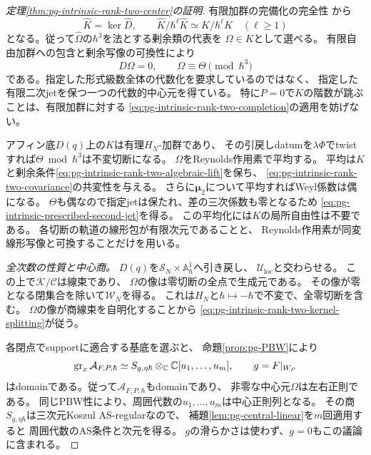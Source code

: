 \begin{proof}[定理\ref{thm:pg-intrinsic-rank-two-center}の証明]
有限加群の完備化の完全性
\cite[Lemmas~10.97.1--10.97.2, Tags~00MA--00MB]{PStacks}から
\begin{equation}
 \widehat K=\ker\widehat D,\qquad
 \widehat K/\hbar^\ell\widehat K\simeq K/\hbar^\ell K\quad(\ell\ge1)
 \label{eq:pg-intrinsic-rank-two-completion}
\end{equation}
となる。従って$\widehat\Omega$の$\hbar^3$を法とする剰余類の代表を
$\Omega\in K$として選べる。
有限自由加群への包含と剰余写像の可換性により
\begin{equation}
 D\Omega=0,\qquad \Omega\equiv\Theta\pmod{\hbar^3}
 \label{eq:pg-intrinsic-rank-two-algebraic-lift}
\end{equation}
である。指定した形式級数全体の代数化を要求しているのではなく、
指定した有限二次jetを保つ一つの代数的中心元を得ている。
特に$P=0$で$K$の階数が跳ぶことは、有限加群に対する
\eqref{eq:pg-intrinsic-rank-two-completion}の適用を妨げない。

アフィン底$D(q)$上の$K$は有理$H_N$-加群であり、
その引戻しdatumを$\lambda\Phi$でtwistすれば$\Theta\bmod\hbar^3$は不変切断になる。
$\Omega$をReynolds作用素で平均する。
平均は$K$と剰余条件\eqref{eq:pg-intrinsic-rank-two-algebraic-lift}を保ち、
\eqref{eq:pg-intrinsic-rank-two-covariance}の共変性を与える。
さらに$\boldsymbol\mu_2$について平均すればWeyl係数は偶になる。
$\Theta$も偶なので指定jetは保たれ、差の三次係数も零となるため
\eqref{eq:pg-intrinsic-prescribed-second-jet}を得る。
この平均化には$K$の局所自由性は不要である。
各切断の軌道の線形包が有限次元であることと、
Reynolds作用素が同変線形写像と可換することだけを用いる。

\emph{全次数の性質と中心商。}
$D(q)$を$\mathcal S_N\times\mathbb A^1_\hbar$へ引き戻し、
$\mathcal U_{\mathrm{loc}}$と交わらせる。
この上で$\mathcal K/\mathcal C$は線束であり、
$\Omega$の像は零切断の全点で生成元である。
その像が零となる閉集合を除いて$\mathcal W_N$を得る。
これは$H_N$と$\hbar\mapsto-\hbar$で不変で、全零切断を含む。
$\Omega$の像が商線束を自明化することから
\eqref{eq:pg-intrinsic-rank-two-kernel-splitting}が従う。

各閉点でsupportに適合する基底を選ぶと、
命題\ref{prop:pg-PBW}により
\begin{equation}
 \operatorname{gr}_x\mathcal A_{F,P,\hbar}
   \simeq S_{g,\eta\hbar}\otimes_\mathbb C\mathbb C[u_1,\ldots,u_m],
 \qquad g=F|_{W_P}
 \label{eq:pg-intrinsic-rank-two-fiber-domain}
\end{equation}
はdomainである。従って$\mathcal A_{F,P,\hbar}$もdomainであり、
非零な中心元$\Omega$は左右正則である。
同じPBW性により、周囲代数の$u_1,\ldots,u_m$は中心正則列となる。
その商$S_{g,\eta\hbar}$は三次元Koszul AS-regularなので、
補題\ref{lem:pg-central-linear}を$m$回適用すると
周囲代数のAS条件と次元を得る。
$g$の滑らかさは使わず、$g=0$もこの議論に含まれる。


\end{proof}
